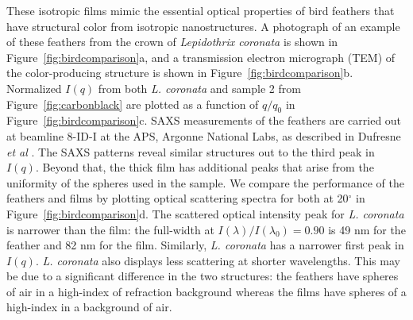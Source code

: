 These isotropic films mimic the essential optical properties of bird feathers that have structural color from isotropic nanostructures.
A photograph of an example of these feathers from the crown of \emph{Lepidothrix coronata} is shown in Figure~\ref{fig:birdcomparison}a, and a transmission electron micrograph (TEM) of the color-producing structure is shown in Figure~\ref{fig:birdcomparison}b.
Normalized $I(q)$ from both \emph{L. coronata} and sample 2 from Figure~\ref{fig:carbonblack} are plotted as a function of $q/q_{0}$ in Figure~\ref{fig:birdcomparison}c.
SAXS measurements of the feathers are carried out at beamline 8-ID-I at the APS, Argonne National Labs, as described in Dufresne \emph{et al} \cite{Dufresne:2009p6342}.
The SAXS patterns reveal similar structures out to the third peak in $I(q)$.
Beyond that, the thick film has additional peaks that arise from the uniformity of the spheres used in the sample.
We compare the performance of the feathers and films by plotting optical scattering spectra for both at 20$^\circ$ in Figure~\ref{fig:birdcomparison}d.
The scattered optical intensity peak for \emph{L. coronata} is narrower than the film: the full-width at $I(\lambda)/I(\lambda_0) = 0.90$ is 49 nm for the feather and 82 nm for the film. 
Similarly, \emph{L. coronata} has a narrower first peak in $I(q)$.
\emph{L. coronata} also displays less scattering at shorter wavelengths.
This may be due to a significant difference in the two structures: the feathers have spheres of air in a high-index of refraction background whereas the films have spheres of a high-index in a background of air.



